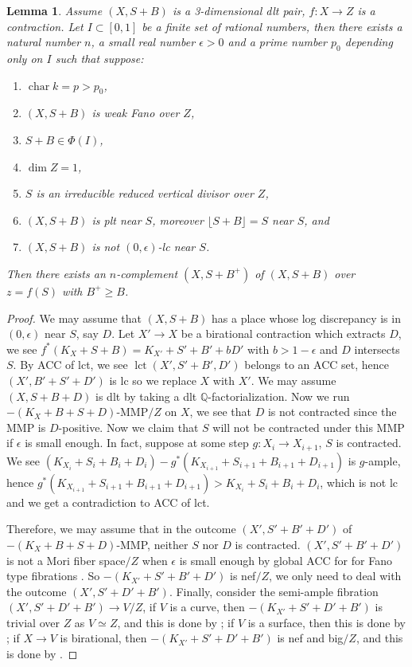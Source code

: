 \documentclass[letterpaper,reqno,12pt]{amsart}
\DeclareMathOperator{\lct}{lct}
\DeclareMathOperator{\chara}{char}
\numberwithin{equation}{section}
\theoremstyle{plain}
\newtheorem{lemma}[theorem]{Lemma}
\begin{document}
\begin{lemma}
\label{relacomp5}
     Assume $(X,S+B)$ is a 3-dimensional dlt pair, $f:X\to Z$ is a contraction. Let  $I\subset[0,1]$ be a finite set of rational numbers, then there exists a natural number $n$, a small real number $\epsilon>0$ and a prime number $p_0$ depending only on $I$ such that suppose:
     \begin{enumerate}
         \item $\chara k=p>p_0$,
         \item $(X,S+B)$ is weak Fano over $Z$,
         \item $S+B\in \Phi(I)$,
         \item $\dim Z= 1$,
         \item $S$ is an irreducible reduced vertical divisor over $Z$,
         \item $(X,S+B)$ is plt near $S$, moreover $\lfloor S+B\rfloor= S$ near $S$, and
         \item $(X,S+B)$ is not $(0,\epsilon)$-lc near $S$.
     \end{enumerate}
      Then there exists an $n$-complement $(X,S+B^+)$ of $(X,S+B)$ over $z=f(S)$ with $B^+\geq B$.
\end{lemma}
\begin{proof}
    We may assume that $(X,S+B)$ has a place whose log discrepancy is in $(0,\epsilon)$ near $S$, say $D$. Let $X'\to X$ be a birational contraction which extracts $D$, we see $f^*(K_X+S+B)=K_{X'}+S'+B'+bD'$ with $b>1-\epsilon$ and $D$ intersects $S$. By ACC of lct, we see $\lct(X',S'+B', D')$ belongs to an ACC set, hence $(X',B'+S'+D')$ is lc so we replace $X$ with $X'$. We may assume $(X,S+B+D)$ is dlt by taking a dlt $\mathbb Q$-factorialization. Now we run $-(K_X+B+S+D)$-MMP$/Z$ on $X$, we see that $D$ is not contracted since the MMP is $D$-positive. Now we claim that $S$ will not be contracted under this MMP if $\epsilon$ is small enough. In fact, suppose at some step $g:X_i\to X_{i+1}$, $S$ is contracted. We see $(K_{X_i}+S_i+B_i+D_i)-g^*(K_{X_{i+1}}+S_{i+1}+B_{i+1}+D_{i+1})$ is $g$-ample, hence $g^*(K_{X_{i+1}}+S_{i+1}+B_{i+1}+D_{i+1})> K_{X_i}+S_i+B_i+D_i$, which is not lc and we get a contradiction to ACC of lct.

    Therefore, we may assume that in the outcome $(X',S'+B'+D')$ of $-(K_X+B+S+D)$-MMP, neither $S$ nor $D$ is contracted. $(X', S'+B'+D')$ is not a Mori fiber space$/Z$ when $\epsilon$ is small enough by global ACC for for Fano type fibrations \cite[5.1]{waldron3mfsimperf}. So $-(K_{X'}+S'+B'+D')$ is nef$/Z$, we only need to deal with the outcome $(X',S'+D'+B')$. Finally, consider the semi-ample fibration $(X',S'+D'+B')\to V/Z$, if $V$ is a curve, then $-(K_{X'}+S'+D'+B')$ is trivial over $Z$ as $V\simeq Z$, and this is done by ; if $V$ is a surface, then this is done by ; if $X\to V$ is birational, then $-(K_{X'}+S'+D'+B')$ is nef and big$/Z$, and this is done by .
\end{proof}
\end{document}

